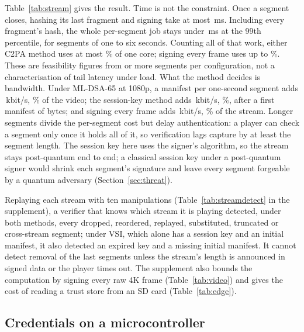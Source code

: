 Table~\ref{tab:stream} gives the result. Time is not the constraint. Once a segment closes, hashing its last fragment and signing take at most \NstreamLatMax\,ms. Including every fragment's hash, the whole per-segment job stays under \NstreamPnnMax\,ms at the 99th percentile, for segments of one to six seconds. Counting all of that work, either C2PA method uses at most \NstreamCpuMax\% of one core; signing every frame uses up to \NstreamFrameCpuMax\%. These are feasibility figures from \NstreamSamplesMin{} or more segments per configuration, not a characterisation of tail latency under load. What the method decides is bandwidth. Under
ML-DSA-65 at 1080p, a manifest per one-second segment adds
\NstreamManOneKbps\,kbit/s, \NstreamManOneShare\% of the video; the session-key
method adds \NstreamVsiOneKbps\,kbit/s, \NstreamVsiOneShare\%, after a first
manifest of \NstreamVsiInit{} bytes; and signing every frame adds
\NstreamFrameOneKbps\,kbit/s, \NstreamFrameOneShare\% of the stream. Longer
segments divide the per-segment cost but delay authentication: a player can
check a segment only once it holds all of it, so verification lags capture by
at least the segment length. The session key here uses the signer's
algorithm, so the stream stays post-quantum end to end; a classical session
key under a post-quantum signer would shrink each segment's signature and
leave every segment forgeable by a quantum adversary (Section~\ref{sec:threat}).

Replaying each stream with ten manipulations (Table~\ref{tab:streamdetect} in the supplement), a verifier that knows which stream it is playing detected, under both methods, every dropped, reordered, replayed, substituted, truncated or cross-stream segment; under VSI, which alone has a session key and an initial manifest, it also detected an expired key and a missing initial manifest. It cannot detect removal of the last segments unless the stream's length is announced in signed data or the player times out. The supplement also bounds the computation by signing every raw 4K frame (Table~\ref{tab:video}) and gives the cost of reading a trust store from an SD card (Table~\ref{tab:edge}).

\subsection{Credentials on a microcontroller}
\label{sec:mcu}

